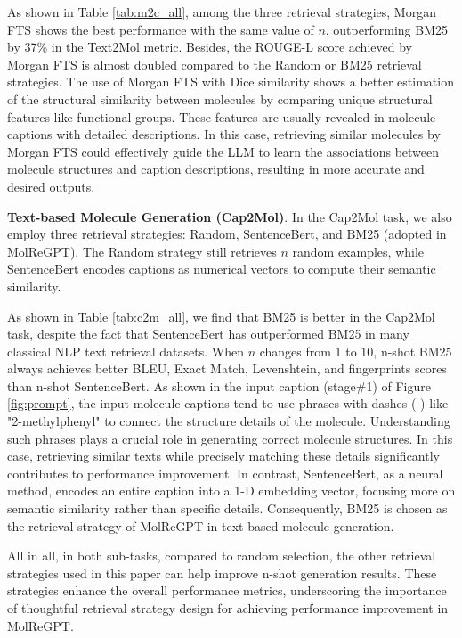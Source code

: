 \documentclass{article}
\theoremstyle{plain}
\theoremstyle{definition}
\theoremstyle{remark}
\begin{document}
As shown in Table \ref{tab:m2c_all}, among the three retrieval strategies, Morgan FTS shows the best performance with the same value of $n$, outperforming BM25 by 37\% in the Text2Mol metric. Besides, the ROUGE-L score achieved by Morgan FTS is almost doubled compared to the Random or BM25 retrieval strategies. 
The use of Morgan FTS with Dice similarity shows a better estimation of the structural similarity between molecules by comparing unique structural features like functional groups. These features are usually revealed in molecule captions with detailed descriptions. In this case, retrieving similar molecules by Morgan FTS could effectively guide the LLM to learn the associations between molecule structures and caption descriptions, resulting in more accurate and desired outputs.

\textbf{Text-based Molecule Generation (Cap2Mol)}. 
In the Cap2Mol task, we also employ three retrieval strategies: Random, SentenceBert, and BM25 (adopted in MolReGPT). The Random strategy still retrieves \(n\) random examples, while SentenceBert encodes captions as numerical vectors to compute their semantic similarity.

As shown in Table \ref{tab:c2m_all}, we find that BM25 is better in the Cap2Mol task, despite the fact that SentenceBert has outperformed BM25 in many classical NLP text retrieval datasets. 
When $n$ changes from 1 to 10, n-shot BM25 always achieves better BLEU, Exact Match, Levenshtein, and fingerprints scores than n-shot SentenceBert.
As shown in the input caption (stage\#1) of Figure \ref{fig:prompt}, the input molecule captions tend to use phrases with dashes (-) like "2-methylphenyl" to connect the structure details of the molecule. 
Understanding such phrases plays a crucial role in generating correct molecule structures. 
In this case, retrieving similar texts while precisely matching these details significantly contributes to performance improvement. In contrast, SentenceBert, as a neural method, encodes an entire caption into a 1-D embedding vector, focusing more on semantic similarity rather than specific details.
Consequently, BM25 is chosen as the retrieval strategy of MolReGPT in text-based molecule generation.

All in all, in both sub-tasks, compared to random selection, the other retrieval strategies used in this paper can help improve n-shot generation results. 
These strategies enhance the overall performance metrics, underscoring the importance of thoughtful retrieval strategy design for achieving performance improvement in MolReGPT.
\end{document}
